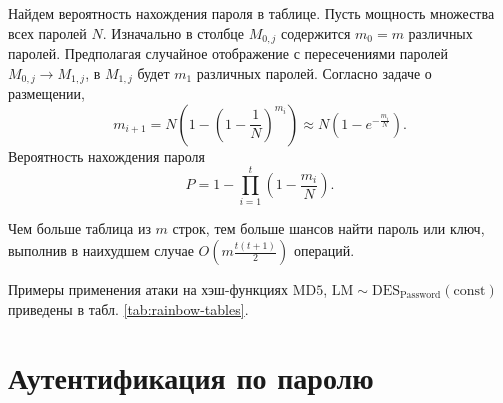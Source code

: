 \documentclass[10pt,a4paper]{book}
\begin{document}
Найдем вероятность нахождения пароля в таблице. Пусть мощность множества всех паролей $N$. Изначально в столбце $M_{0,j}$ содержится $m_0 = m$ различных паролей. Предполагая случайное отображение с пересечениями паролей $M_{0,j} \rightarrow M_{1,j}$, в $M_{1,j}$ будет $m_1$ различных паролей. Согласно задаче о размещении,
\[
    m_{i+1} = N \left( 1 - \left( 1 - \frac{1}{N} \right)^{m_i} \right) \approx N \left( 1 - e^{-\frac{m_i}{N}} \right).
\]
Вероятность нахождения пароля
\[
    P = 1 - \prod \limits_{i=1}^t \left( 1 - \frac{m_i}{N} \right).
\]

Чем больше таблица из $m$ строк, тем больше шансов найти пароль или ключ, выполнив в наихудшем случае   $O \left( m \frac{t(t+1)}{2} \right)$ операций.

Примеры применения атаки на хэш-функциях $\textrm{MD5}$, $\textrm{LM} \sim \textrm{DES}_{\textrm{Password}} (\textrm{const})$ приведены в табл. \ref{tab:rainbow-tables}.

\begin{table}[!ht]
    \centering
    \caption{Атаки на радужных таблицах на \emph{одном} ПК\label{tab:rainbow-tables}}
\end{table}


\section{Аутентификация по паролю}
\end{document}
